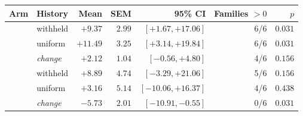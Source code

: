 \begin{tabular}{llrrrrr}
\toprule
Arm & History & Mean & SEM & 95\% CI & Families $>0$ & $p$ \\
\midrule
\mt{} & withheld & $+9.37$ & $2.99$ & $[+1.67,+17.06]$ & 6/6 & $0.031$ \\
\mt{} & uniform & $+11.49$ & $3.25$ & $[+3.14,+19.84]$ & 6/6 & $0.031$ \\
 & \emph{change} & $+2.12$ & $1.04$ & $[-0.56,+4.80]$ & 4/6 & $0.156$ \\
\midrule
\pooled{} & withheld & $+8.89$ & $4.74$ & $[-3.29,+21.06]$ & 5/6 & $0.156$ \\
\pooled{} & uniform & $+3.16$ & $5.14$ & $[-10.06,+16.37]$ & 4/6 & $0.438$ \\
 & \emph{change} & $-5.73$ & $2.01$ & $[-10.91,-0.55]$ & 0/6 & $0.031$ \\
\bottomrule
\end{tabular}

